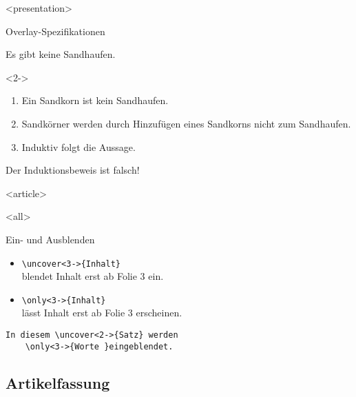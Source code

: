 \mode
<presentation>

\begin{Frame}{Overlay-Spezifikationen}
  \begin{Satz}[Sandhaufensatz]
    Es gibt keine Sandhaufen.
  \end{Satz}

  \begin{Beweis}<2->
    \begin{enumerate}
      \item<3-> Ein Sandkorn ist kein Sandhaufen.
      \item<4-> Sandkörner werden durch Hinzufügen
        eines Sandkorns nicht zum Sandhaufen.
      \item Induktiv folgt die Aussage. \qedhere
    \end{enumerate}
  \end{Beweis}


  Der \alert<6>{Induktionsbeweis} ist
  \alert<7>{falsch}!
\end{Frame}

\mode
<article>

\frame{}

\mode
<all>

\begin{Frame}[fragile]{Ein- und Ausblenden}
  \begin{itemize}
    \item \lstinline|\uncover<3->{Inhalt}|\\ blendet Inhalt erst ab Folie 3 ein.
    \item \lstinline|\only<3->{Inhalt}|\\ lässt Inhalt erst ab Folie 3 erscheinen.
  \end{itemize}

  \xxx
  \pause

  \begin{lstlisting}[gobble=4]
    In diesem \uncover<2->{Satz} werden
    \only<3->{Worte }eingeblendet.
  \end{lstlisting}
\end{Frame}

\subsection{Artikelfassung}

